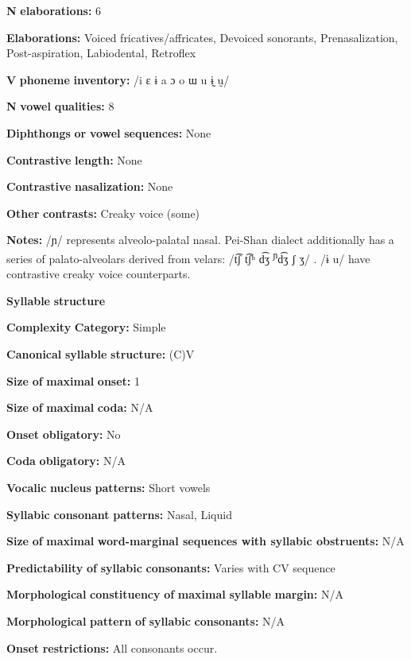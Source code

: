 \begin{styleBody}
\textbf{N} \textbf{elaborations:} 6

\textbf{Elaborations:} Voiced fricatives/affricates, Devoiced sonorants, Prenasalization, Post-aspiration, Labiodental, Retroflex

\textbf{V} \textbf{phoneme} \textbf{inventory:} /i ɛ ɨ a ɔ o ɯ u ɨ̰ ṵ/

\textbf{N} \textbf{vowel} \textbf{qualities:} 8

\textbf{Diphthongs} \textbf{or} \textbf{vowel} \textbf{sequences:} None

\textbf{Contrastive} \textbf{length:} None

\textbf{Contrastive} \textbf{nasalization:} None

\textbf{Other} \textbf{contrasts:} Creaky voice (some)

\textbf{Notes:} /ɲ/ represents alveolo-palatal nasal. Pei-Shan dialect additionally has a series of palato-alveolars derived from velars: /t͡ʃ t͡ʃʰ d͡ʒ \textsuperscript{ɲ}d͡ʒ ʃ ʒ/ \citep[68-9]{Maoji1997}. /ɨ u/ have contrastive creaky voice counterparts.

\textbf{Syllable} \textbf{structure}

\textbf{Complexity} \textbf{Category:} Simple

\textbf{Canonical} \textbf{syllable} \textbf{structure:} (C)V \citep[30-2]{Gerner2013}

\textbf{Size} \textbf{of} \textbf{maximal} \textbf{onset:} 1

\textbf{Size} \textbf{of} \textbf{maximal} \textbf{coda:} N/A

\textbf{Onset} \textbf{obligatory:} No

\textbf{Coda} \textbf{obligatory:} N/A

\textbf{Vocalic} \textbf{nucleus} \textbf{patterns:} Short vowels

\textbf{Syllabic} \textbf{consonant} \textbf{patterns:} Nasal, Liquid

\textbf{Size} \textbf{of} \textbf{maximal} \textbf{word{}-marginal sequences with syllabic obstruents:} N/A

\textbf{Predictability} \textbf{of} \textbf{syllabic} \textbf{consonants:} Varies with CV sequence

\textbf{Morphological} \textbf{constituency} \textbf{of} \textbf{maximal} \textbf{syllable} \textbf{margin:} N/A

\textbf{Morphological} \textbf{pattern} \textbf{of} \textbf{syllabic} \textbf{consonants:} N/A

\textbf{Onset} \textbf{restrictions:} All consonants occur.


\end{styleBody}
